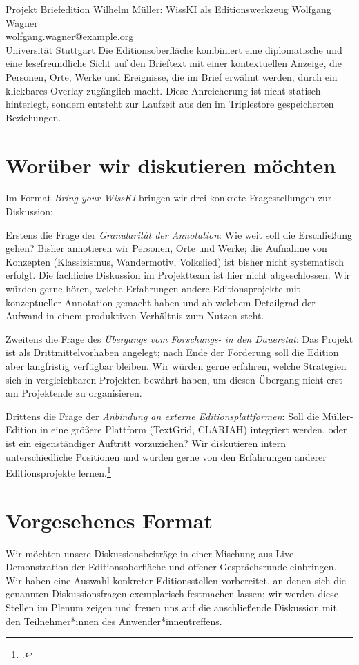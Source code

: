\begin{beitrag}{Projekt \glqq Briefedition Wilhelm Müller\grqq{}: WissKI als Editionswerkzeug}{%
Wolfgang Wagner\, \\
\small \href{mailto:wolfgang.wagner@example.org}{wolfgang.wagner@example.org} \\
\small Universität Stuttgart
}
Die Editionsoberfläche kombiniert eine diplomatische und eine lesefreundliche Sicht auf den Brieftext mit einer kontextuellen Anzeige, die Personen, Orte, Werke und Ereignisse, die im Brief erwähnt werden, durch ein klickbares Overlay zugänglich macht. Diese Anreicherung ist nicht statisch hinterlegt, sondern entsteht zur Laufzeit aus den im Triplestore gespeicherten Beziehungen.

\section{Worüber wir diskutieren möchten}
Im Format \emph{Bring your WissKI} bringen wir drei konkrete Fragestellungen zur Diskussion:

Erstens die Frage der \emph{Granularität der Annotation}: Wie weit soll die Erschließung gehen? Bisher annotieren wir Personen, Orte und Werke; die Aufnahme von Konzepten (\glqq Klassizismus\grqq{}, \glqq Wandermotiv\grqq{}, \glqq Volkslied\grqq{}) ist bisher nicht systematisch erfolgt. Die fachliche Diskussion im Projektteam ist hier nicht abgeschlossen. Wir würden gerne hören, welche Erfahrungen andere Editionsprojekte mit konzeptueller Annotation gemacht haben und ab welchem Detailgrad der Aufwand in einem produktiven Verhältnis zum Nutzen steht.

Zweitens die Frage des \emph{Übergangs vom Forschungs- in den Daueretat}: Das Projekt ist als Drittmittelvorhaben angelegt; nach Ende der Förderung soll die Edition aber langfristig verfügbar bleiben. Wir würden gerne erfahren, welche Strategien sich in vergleichbaren Projekten bewährt haben, um diesen Übergang nicht erst am Projektende zu organisieren.

Drittens die Frage der \emph{Anbindung an externe Editionsplattformen}: Soll die Müller-Edition in eine größere Plattform (TextGrid, CLARIAH) integriert werden, oder ist ein eigenständiger Auftritt vorzuziehen? Wir diskutieren intern unterschiedliche Positionen und würden gerne von den Erfahrungen anderer Editionsprojekte lernen.\footcite{wagner2025-plattformen}

\section{Vorgesehenes Format}
Wir möchten unsere Diskussionsbeiträge in einer Mischung aus Live-Demonstration der Editionsoberfläche und offener Gesprächsrunde einbringen. Wir haben eine Auswahl konkreter Editionsstellen vorbereitet, an denen sich die genannten Diskussionsfragen exemplarisch festmachen lassen; wir werden diese Stellen im Plenum zeigen und freuen uns auf die anschließende Diskussion mit den Teilnehmer*innen des Anwender*innentreffens.


\end{beitrag}

